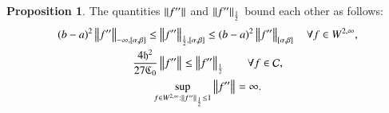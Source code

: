 \documentclass[review]{elsarticle}
\theoremstyle{definition}
\renewcommand{\cw}{W}
\newtheorem{prop}[theorem]{Proposition}
\begin{document}
\begin{prop} \label{equivnormprop}
	The quantities $\norm{f''}$ and $\norm[\frac 12]{f''}$ bound each other as follows:
	\begin{subequations}
		\begin{gather}
		\label{halflessinf}
		(b-a)^2\norm[-\infty,{[\alpha,\beta]}]{f''}  \le \norm[\frac 12,{[\alpha,\beta]}]{f''}
		\le (b-a)^2 \norm[{[\alpha,\beta]}]{f''} \quad \forall f \in \cw^{2,\infty}, \\
		\label{inflesshalf}
		\frac{4\fh^2}{27\fC_0} \norm{f''} \le \norm[\frac 12]{f''} \qquad \forall f \in \cc, \\
		\label{infhalfnoteq}
		\sup_{f \in \cw^{2,\infty} :  \norm[\frac 12]{f''} \le 1}  \norm{f''}
		= \infty.
		\end{gather}
	\end{subequations}
\end{prop}
\end{document}
